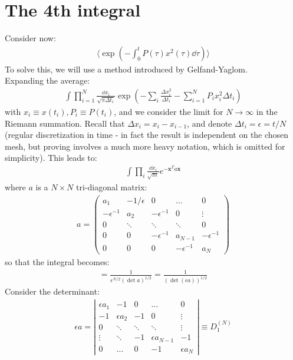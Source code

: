 \documentclass[../template.tex]{subfiles}
\begin{document}
\section{The 4th integral}
Consider now:
\begin{align*}
    \langle \exp\left(-\int_0^t P(\tau) x^2(\tau) \dd{\tau}\right) \rangle
\end{align*}
To solve this, we will use a method introduced by Gelfand-Yaglom.\\
Expanding the average:
\begin{align*}
    \int \prod_{i=1}^N \frac{\dd{x_i}}{\sqrt{\pi \Delta t_i}} \exp\left(-\sum_i \frac{\Delta x_i^2}{\Delta t_i} - \sum_{i=1}^N P_i x_i^2 \Delta t_i\right) 
\end{align*}
with $x_i \equiv x(t_i), P_i \equiv P(t_i)$, and we consider the limit for $N \to \infty$ in the Riemann summation. Recall that $\Delta x_i = x_i - x_{i-1}$, and denote $\Delta t_i = \epsilon = t/N$ (regular discretization in time - in fact the result is independent on the chosen mesh, but proving involves a much more heavy notation, which is omitted for simplicity). This leads to:
\begin{align*}
    \int \prod_i \frac{\dd{x_i}}{\sqrt{\pi \epsilon}} e^{-\bm{x}^T a \bm{x}}
\end{align*}   
where $a$ is a $N \times N$ tri-diagonal matrix: 
\begin{align*}
    a = \left(\begin{array}{ccccc}
    a_1 & - 1/\epsilon & 0 & \dots & 0 \\ 
    -\epsilon^{-1} & a_2 & -\epsilon^{-1} & 0 & \vdots\\ 
    0 & \ddots & \ddots & \ddots & 0\\ 
    0 & 0 & -\epsilon^{-1} & a_{N-1} & -\epsilon^{-1}\\
    0 & 0 & 0 & -\epsilon^{-1} & a_N
    \end{array}\right)
\end{align*}
so that the integral becomes:
\begin{align*}
    = \frac{1}{\epsilon^{N/2} (\operatorname{det} a )^{1/2}} = \frac{1}{(\operatorname{det}(\epsilon a))^{1/2} }  
\end{align*}
Consider the determinant:
\begin{align*}
    \epsilon a = \left|\begin{array}{ccccc}
    \epsilon a_1 & -1 & 0 & \dots & 0 \\ 
    -1 & \epsilon a_2 & -1 & 0 & \vdots \\ 
    0 & \ddots & \ddots & \ddots & \vdots \\ 
    \vdots & \ddots & -1 & \epsilon a_{N-1} & -1 \\ 
    0 & \dots & 0 & -1 & \epsilon a_N
    \end{array}\right| \equiv D_1^{(N)}
\end{align*}
\end{document}
